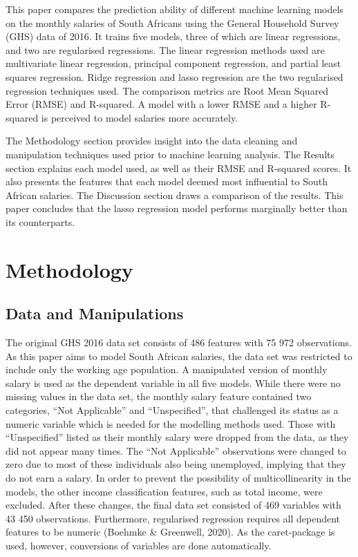 \documentclass[11pt,preprint, authoryear]{elsarticle}
\numberwithin{equation}{section}
\numberwithin{figure}{section}
\numberwithin{table}{section}
\begin{document}
This paper compares the prediction ability of different machine learning
models on the monthly salaries of South Africans using the General
Household Survey (GHS) data of 2016. It trains five models, three of
which are linear regressions, and two are regularised regressions. The
linear regression methods used are multivariate linear regression,
principal component regression, and partial least squares regression.
Ridge regression and lasso regression are the two regularised regression
techniques used. The comparison metrics are Root Mean Squared Error
(RMSE) and R-squared. A model with a lower RMSE and a higher R-squared
is perceived to model salaries more accurately.

The Methodology section provides insight into the data cleaning and
manipulation techniques used prior to machine learning analysis. The
Results section explains each model used, as well as their RMSE and
R-squared scores. It also presents the features that each model deemed
most influential to South African salaries. The Discussion section draws
a comparison of the results. This paper concludes that the lasso
regression model performs marginally better than its counterparts.

\hypertarget{methodology}{%
\section{Methodology}\label{methodology}}

\hypertarget{data-and-manipulations}{%
\subsection{Data and Manipulations}\label{data-and-manipulations}}

The original GHS 2016 data set consists of 486 features with 75 972
observations. As this paper aims to model South African salaries, the
data set was restricted to include only the working age population. A
manipulated version of monthly salary is used as the dependent variable
in all five models. While there were no missing values in the data set,
the monthly salary feature contained two categories, ``Not Applicable''
and ``Unspecified'', that challenged its status as a numeric variable
which is needed for the modelling methods used. Those with
``Unspecified'' listed as their monthly salary were dropped from the
data, as they did not appear many times. The ``Not Applicable''
observations were changed to zero due to most of these individuals also
being unemployed, implying that they do not earn a salary. In order to
prevent the possibility of multicollinearity in the models, the other
income classification features, such as total income, were excluded.
After these changes, the final data set consisted of 469 variables with
43 450 observations. Furthermore, regularised regression requires all
dependent features to be numeric (Boehmke \& Greenwell, 2020). As the
caret-package is used, however, conversions of variables are done
automatically.
\end{document}
